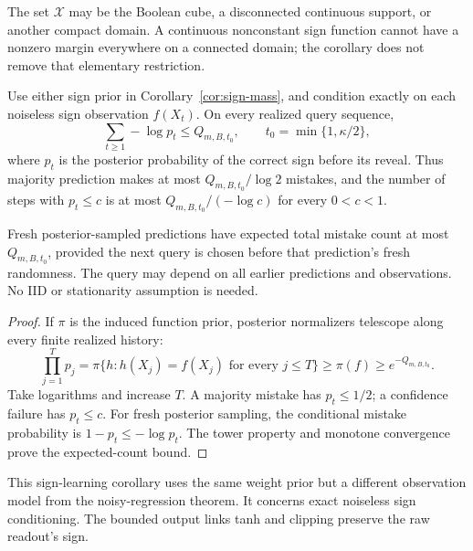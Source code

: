 The set $\mathcal X$ may be the Boolean cube, a disconnected continuous support, or another compact domain. A continuous nonconstant sign function cannot have a nonzero margin everywhere on a connected domain; the corollary does not remove that elementary restriction.

\begin{corollary}\label{cor:online}
Use either sign prior in Corollary~\ref{cor:sign-mass}, and condition exactly on each noiseless sign observation $f(X_t)$. On every realized query sequence,
\[
 \sum_{t\ge1}-\log p_t\le Q_{m,B,t_0},
 \qquad t_0=\min\{1,\kappa/2\},
\]
where $p_t$ is the posterior probability of the correct sign before its reveal. Thus majority prediction makes at most $Q_{m,B,t_0}/\log2$ mistakes, and the number of steps with $p_t\le c$ is at most $Q_{m,B,t_0}/(-\log c)$ for every $0<c<1$.

Fresh posterior-sampled predictions have expected total mistake count at most $Q_{m,B,t_0}$, provided the next query is chosen before that prediction's fresh randomness. The query may depend on all earlier predictions and observations. No IID or stationarity assumption is needed.
\end{corollary}
\begin{proof}
If $\pi$ is the induced function prior, posterior normalizers telescope along every finite realized history:
\[
 \prod_{j=1}^T p_j
 =\pi\{h:h(X_j)=f(X_j)\text{ for every }j\le T\}
 \ge\pi(f)\ge e^{-Q_{m,B,t_0}}.
\]
Take logarithms and increase $T$. A majority mistake has $p_t\le1/2$; a confidence failure has $p_t\le c$. For fresh posterior sampling, the conditional mistake probability is $1-p_t\le-\log p_t$. The tower property and monotone convergence prove the expected-count bound.
\end{proof}

This sign-learning corollary uses the same weight prior but a different observation model from the noisy-regression theorem. It concerns exact noiseless sign conditioning. The bounded output links tanh and clipping preserve the raw readout's sign.
